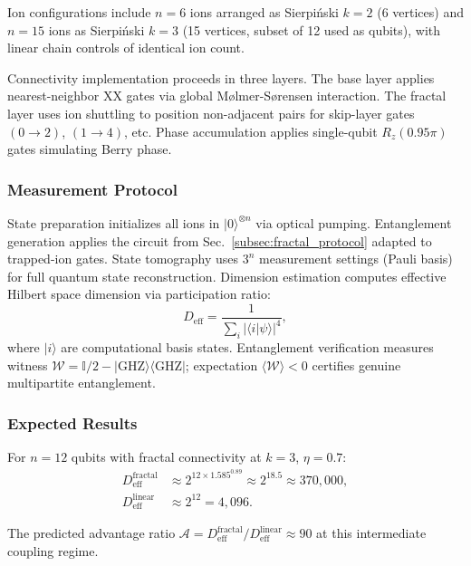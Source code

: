 Ion configurations include $n = 6$ ions arranged as Sierpi\'{n}ski $k = 2$ (6 vertices) and $n = 15$ ions as Sierpi\'{n}ski $k = 3$ (15 vertices, subset of 12 used as qubits), with linear chain controls of identical ion count.

Connectivity implementation proceeds in three layers. The base layer applies nearest-neighbor XX gates via global M{\o}lmer-S{\o}rensen interaction. The fractal layer uses ion shuttling to position non-adjacent pairs for skip-layer gates $(0 \to 2)$, $(1 \to 4)$, etc. Phase accumulation applies single-qubit $R_z(0.95\pi)$ gates simulating Berry phase.

\subsubsection{Measurement Protocol}

State preparation initializes all ions in $|0\rangle^{\otimes n}$ via optical pumping. Entanglement generation applies the circuit from Sec.~\ref{subsec:fractal_protocol} adapted to trapped-ion gates. State tomography uses $3^n$ measurement settings (Pauli basis) for full quantum state reconstruction. Dimension estimation computes effective Hilbert space dimension via participation ratio:
\begin{equation}
D_{\mathrm{eff}} = \frac{1}{\sum_i |\langle i | \psi \rangle|^4},
\label{eq:participation}
\end{equation}
where $|i\rangle$ are computational basis states. Entanglement verification measures witness $\mathcal{W} = \mathbb{I}/2 - |\mathrm{GHZ}\rangle\langle\mathrm{GHZ}|$; expectation $\langle \mathcal{W} \rangle < 0$ certifies genuine multipartite entanglement.

\subsubsection{Expected Results}

For $n = 12$ qubits with fractal connectivity at $k = 3$, $\eta = 0.7$:
\begin{align}
D_{\mathrm{eff}}^{\mathrm{fractal}} &\approx 2^{12 \times 1.585^{0.89}} \approx 2^{18.5} \approx 370{,}000, \\
D_{\mathrm{eff}}^{\mathrm{linear}} &\approx 2^{12} = 4{,}096.
\end{align}

The predicted advantage ratio $\mathcal{A} = D_{\mathrm{eff}}^{\mathrm{fractal}} / D_{\mathrm{eff}}^{\mathrm{linear}} \approx 90$ at this intermediate coupling regime.

